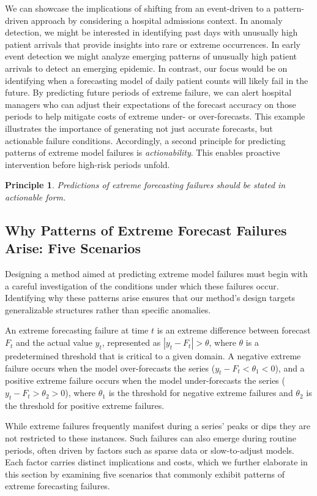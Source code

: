 \documentclass[preprint,12pt]{elsarticle}
\newtheorem{principle}{Principle}
\begin{document}
We can showcase the implications of shifting from an event-driven to a pattern-driven approach by considering a hospital admissions context. In anomaly detection, we might be interested in identifying past days with unusually high patient arrivals that provide insights into rare or extreme occurrences. In early event detection we might analyze emerging patterns of unusually high patient arrivals to detect an emerging epidemic. In contrast, our focus would be on identifying when a forecasting model of daily patient counts will likely fail in the future. By predicting future periods of extreme failure, we can alert hospital managers who can adjust their expectations of the forecast accuracy on those periods to help mitigate costs of extreme under- or over-forecasts. This example illustrates the importance of generating not just accurate forecasts, but actionable failure conditions. Accordingly, a second principle for predicting patterns of extreme model failures is \emph{actionability}. This enables proactive intervention before high-risk periods unfold.

\begin{principle}
\textit{Predictions of extreme forecasting failures should be stated in actionable form.}
\end{principle}

\subsection{Why Patterns of Extreme Forecast Failures Arise: Five Scenarios}

Designing a method aimed at predicting extreme model failures must begin with a careful investigation of the conditions under which these failures occur. Identifying why these patterns arise ensures that our method’s design targets generalizable structures rather than specific anomalies.

An extreme forecasting failure at time $t$ is an extreme difference between forecast $F_t$ and the actual value $y_t$, represented as $|y_t - F_t| > \theta$, where $\theta$ is a predetermined threshold that is critical to a given domain. A negative extreme failure occurs when the model over-forecasts the series ($y_t - F_t < \theta_1 < 0$), and a positive extreme failure occurs when the model under-forecasts the series ($y_t - F_t > \theta_2 > 0$), where $\theta_1$ is the threshold for negative extreme failures and $\theta_2$ is the threshold for positive extreme failures.

While extreme failures frequently manifest during a series’ peaks or dips \citep{marvin2022} they are not restricted to these instances. Such failures can also emerge during routine periods, often driven by factors such as sparse data or slow-to-adjust models. Each factor carries distinct implications and costs, which we further elaborate in this section by examining five scenarios that commonly exhibit patterns of extreme forecasting failures.
\end{document}
